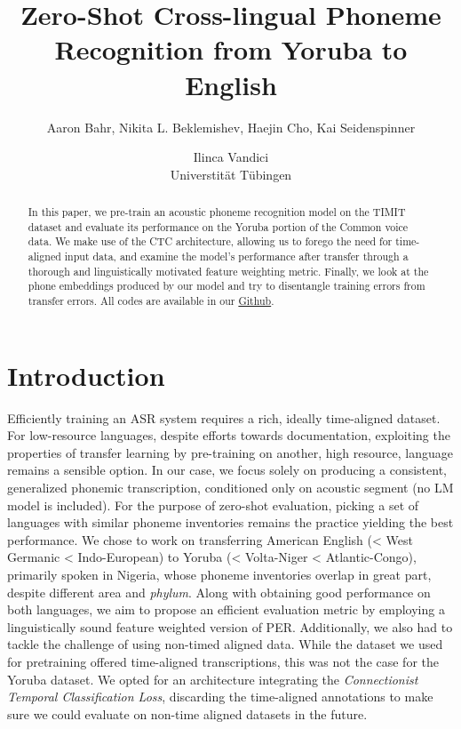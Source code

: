 \documentclass[11pt]{article}
\title{Zero-Shot Cross-lingual Phoneme Recognition from Yoruba to English}
\author{Aaron Bahr, Nikita L. Beklemishev, Haejin Cho, Kai Seidenspinner \and Ilinca Vandici \\
         Universtität Tübingen }
\begin{document}
\maketitle
\outauthor
\begin{abstract}
In this paper, we pre-train an acoustic phoneme recognition model on the TIMIT dataset and evaluate its performance on the Yoruba portion of the Common voice data. We make use of the CTC architecture, allowing us to forego the need for time-aligned input data, and examine the model’s performance after transfer through a thorough and linguistically motivated feature weighting metric. Finally, we look at the phone embeddings produced by our model and try to disentangle training errors from transfer errors. All codes are available in our \href{https://github.com/lilovyjgrib/X-lingual_IPA_ASR}{Github}.
\end{abstract}

\section{Introduction}
Efficiently training an ASR system requires a rich, ideally time-aligned dataset. For low-resource languages, despite efforts towards documentation, exploiting the properties of transfer learning by pre-training on another, high resource, language remains a sensible option. In our case, we focus solely on producing a consistent, generalized phonemic transcription, conditioned only on acoustic segment (no LM model is included). For the purpose of zero-shot evaluation, picking a set of languages with similar phoneme inventories remains the practice yielding the best performance. We chose to work on transferring American English (< West Germanic < Indo-European) to Yoruba (< Volta-Niger < Atlantic-Congo), primarily spoken in Nigeria, whose phoneme inventories overlap in great part, despite different area and \textit{phylum}.
Along with obtaining good performance on both languages, we aim to propose an efficient evaluation metric by employing a linguistically sound feature weighted version of PER.
Additionally, we also had to tackle the challenge of using non-timed aligned data. While the dataset we used for pretraining offered time-aligned transcriptions, this was not the case for the Yoruba dataset. We opted for an architecture integrating the \textit{Connectionist Temporal Classification Loss}, discarding the time-aligned annotations to make sure we could evaluate on non-time aligned datasets in the future.
\end{document}
